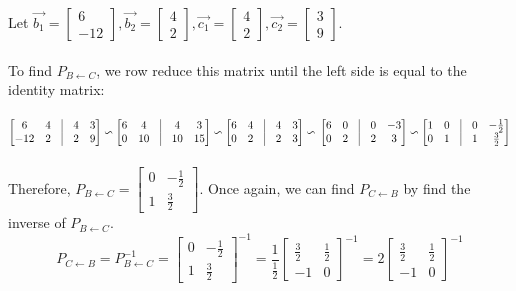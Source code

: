 \documentclass{article}%
\begin{document}
Let $\vec{b_1} =
\begin{bmatrix}
    6 \\ -12
\end{bmatrix},
\vec{b_2} =
\begin{bmatrix}
    4 \\ 2
\end{bmatrix},
\vec{c_1} =
\begin{bmatrix}
    4 \\ 2
\end{bmatrix},
\vec{c_2} =
\begin{bmatrix}
    3 \\ 9
\end{bmatrix}$.\\
\\[0.1in]
To find $P_{B \leftarrow C}$, we row reduce this matrix until the left side is equal to the identity matrix:\\
\\
$
\begin{bmatrix}
    6 & 4 & \vline & 4 & 3 \\
    -12 & 2 & \vline & 2 & 9
\end{bmatrix}
\backsim
\begin{bmatrix}
    6 & 4 & \vline & 4 & 3 \\
    0 & 10 & \vline & 10 & 15
\end{bmatrix}
\backsim
\begin{bmatrix}
    6 & 4 & \vline & 4 & 3 \\
    0 & 2 & \vline & 2 & 3
\end{bmatrix}
\backsim\\
\\[0.05in]
\begin{bmatrix}
    6 & 0 & \vline & 0 & -3 \\
    0 & 2 & \vline & 2 & 3
\end{bmatrix}
\backsim
\begin{bmatrix}
    1 & 0 & \vline & 0 & -\frac{1}{2} \\
    0 & 1 & \vline & 1 & \frac{3}{2}
\end{bmatrix}$\\
\\[0.1in]
Therefore, $P_{B \leftarrow C} =
\begin{bmatrix}
    0 & -\frac{1}{2} \\
    1 & \frac{3}{2}
\end{bmatrix}$. Once again, we can find $P_{C \leftarrow B}$ by find the inverse of $P_{B \leftarrow C}$.
\[
    P_{C \leftarrow B} = P_{B \leftarrow C}^{-1} =
    \begin{bmatrix}
        0 & -\frac{1}{2} \\
        1 & \frac{3}{2}
    \end{bmatrix}^{-1}
    =
    \frac{1}{\frac{1}{2}}
    \begin{bmatrix}
        \frac{3}{2} & \frac{1}{2} \\
        -1 & 0
    \end{bmatrix}^{-1}
    = 2
    \begin{bmatrix}
        \frac{3}{2} & \frac{1}{2} \\
        -1 & 0
    \end{bmatrix}^{-1}
\]
\end{document}
